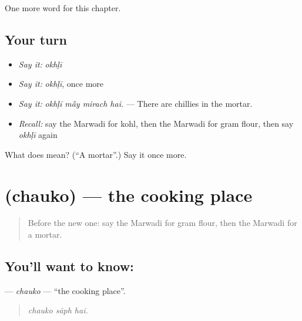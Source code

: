 \begin{grammarlens}[title={What you've built}]
One more word for this chapter.
\end{grammarlens}

\subsection*{Your turn}
\begin{itemize}
\raggedright
  \item \emph{Say it:} \emph{okhḷī}
  \item \emph{Say it:} \emph{okhḷī}, once more
  \item \emph{Say it:} \emph{okhḷī mā̃y mirach hai.} — There are chillies in the mortar.
  \item \emph{Recall:} say the Marwadi for kohl, then the Marwadi for gram flour, then say \emph{okhḷī} again
\end{itemize}

\begin{tcolorbox}[breakable,colback=teal!4,colframe=teal!35!black,title={Before you move on}]
What does  mean? (\textquotedblleft{}A mortar\textquotedblright{}.) Say it once more.
\end{tcolorbox}
\section[\texorpdfstring{\mw{चौको} (chauko)}{चौको (chauko)}]{ (chauko) — the cooking place}

\label{lesson:MW-C184-chauko}



\begin{quote}
Before the new one: say the Marwadi for gram flour, then the Marwadi for a mortar.
\end{quote}

\subsection*{You'll want to know: }
\textbf{} — \emph{chauko} — \textquotedblleft{}the cooking place\textquotedblright{}.

\begin{quote}
  
\end{quote}

\begin{quote}
\emph{chauko sāph hai.}
\end{quote}

